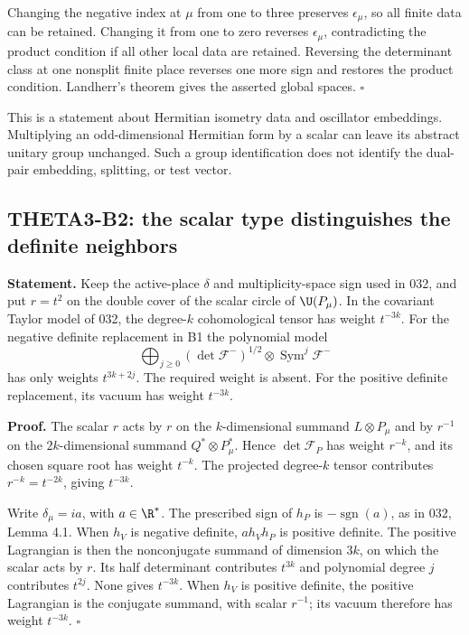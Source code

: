 \documentclass[11pt]{article}
\theoremstyle{definition}\newtheorem{definition}[theorem]{Definition}\newtheorem{remark}[theorem]{Remark}
\begin{document}
Changing the negative index at $\mu$ from one to three preserves $\epsilon_\mu$, so all finite data can be retained. Changing it from one to zero reverses $\epsilon_\mu$, contradicting the product condition if all other local data are retained. Reversing the determinant class at one nonsplit finite place reverses one more sign and restores the product condition. Landherr's theorem gives the asserted global spaces. \hfill$\square$

This is a statement about Hermitian isometry data and oscillator embeddings. Multiplying an odd-dimensional Hermitian form by a scalar can leave its abstract unitary group unchanged. Such a group identification does not identify the dual-pair embedding, splitting, or test vector.

\subsection{THETA3-B2: the scalar type distinguishes the definite neighbors}\label{B2}

\textbf{Statement.} Keep the active-place $\delta$ and multiplicity-space sign used in 032, and put $r=t^2$ on the double cover of the scalar circle of $\U(P_\mu)$. In the covariant Taylor model of 032, the degree-$k$ cohomological tensor has weight $t^{-3k}$. For the negative definite replacement in B1 the polynomial model
\[
 \bigoplus_{j\geq0}(\det\mathcal F^-)^{1/2}\otimes
                    \operatorname{Sym}^j\mathcal F^-
\]
has only weights $t^{3k+2j}$. The required weight is absent. For the positive definite replacement, its vacuum has weight $t^{-3k}$.

\textbf{Proof.} The scalar $r$ acts by $r$ on the $k$-dimensional summand $L\otimes P_\mu$ and by $r^{-1}$ on the $2k$-dimensional summand $Q^*\otimes P_\mu^*$. Hence $\det\mathcal F_P$ has weight $r^{-k}$, and its chosen square root has weight $t^{-k}$. The projected degree-$k$ tensor contributes $r^{-k}=t^{-2k}$, giving $t^{-3k}$.

Write $\delta_\mu=ia$, with $a\in\R^*$. The prescribed sign of $h_P$ is $-\operatorname{sgn}(a)$, as in 032, Lemma 4.1. When $h_V$ is negative definite, $a h_Vh_P$ is positive definite. The positive Lagrangian is then the nonconjugate summand of dimension $3k$, on which the scalar acts by $r$. Its half determinant contributes $t^{3k}$ and polynomial degree $j$ contributes $t^{2j}$. None gives $t^{-3k}$. When $h_V$ is positive definite, the positive Lagrangian is the conjugate summand, with scalar $r^{-1}$; its vacuum therefore has weight $t^{-3k}$. \hfill$\square$
\end{document}
